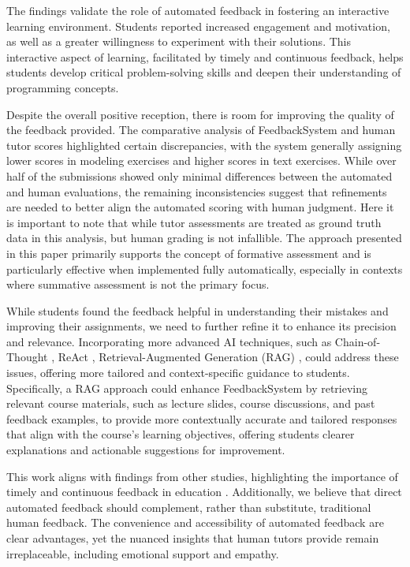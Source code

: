 \documentclass[sigconf,screen,review,anonymous]{acmart}
\begin{document}
The findings validate the role of automated feedback in fostering an interactive learning environment.
Students reported increased engagement and motivation, as well as a greater willingness to experiment with their solutions.
This interactive aspect of learning, facilitated by timely and continuous feedback, helps students develop critical problem-solving skills and deepen their understanding of programming concepts.

Despite the overall positive reception, there is room for improving the quality of the feedback provided.
The comparative analysis of FeedbackSystem and human tutor scores highlighted certain discrepancies, with the system generally assigning lower scores in modeling exercises and higher scores in text exercises.
While over half of the submissions showed only minimal differences between the automated and human evaluations, the remaining inconsistencies suggest that refinements are needed to better align the automated scoring with human judgment.
Here it is important to note that while tutor assessments are treated as ground truth data in this analysis, but human grading is not infallible.
The approach presented in this paper primarily supports the concept of formative assessment and is particularly effective when implemented fully automatically, especially in contexts where summative assessment is not the primary focus.

While students found the feedback helpful in understanding their mistakes and improving their assignments, we need to further refine it to enhance its precision and relevance.
Incorporating more advanced AI techniques, such as Chain-of-Thought \cite{wei:2022:ChainofThoughtPromptingElicits}, ReAct \cite{yao:2023:ReActSynergizingReasoning}, Retrieval-Augmented Generation (RAG) \cite{gao:2024:RetrievalAugmentedGenerationLarge},
could address these issues, offering more tailored and context-specific guidance to students.
Specifically, a RAG approach could enhance FeedbackSystem by retrieving relevant course materials, such as lecture slides, course discussions, and past feedback examples, to provide more contextually accurate and tailored responses that align with the course's learning objectives, offering students clearer explanations and actionable suggestions for improvement.

This work aligns with findings from other studies, highlighting the importance of timely and continuous feedback in education \cite{shute:2008:FocusFormativeFeedback, dawson:2019:WhatMakesEffective}.
Additionally, we believe that direct automated feedback should complement, rather than substitute, traditional human feedback.
The convenience and accessibility of automated feedback are clear advantages, yet the nuanced insights that human tutors provide remain irreplaceable, including emotional support and empathy.
\end{document}
